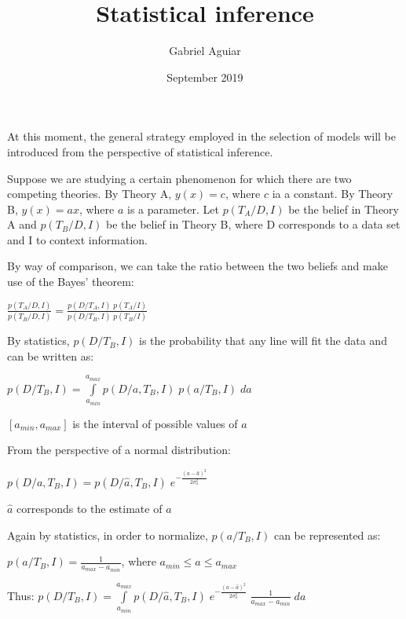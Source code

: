 \documentclass{article}
\title{Statistical inference}
\author{Gabriel Aguiar}
\date{September 2019}
\begin{document}
\maketitle

At this moment, the general strategy employed in the selection of models will be introduced from the perspective of statistical inference.

Suppose we are studying a certain phenomenon for which there are two competing theories. By Theory A, $y(x) = c$, where $c$ ia a constant. By Theory B, $y(x) = ax$, where $a$ is a parameter. Let $p(T_{A}/D,I)$ be the belief in Theory A and $p(T_{B}/D,I)$ be the belief in Theory B, where D corresponds to a data set and I to context information.

By way of comparison, we can take the ratio between the two beliefs and make use of the Bayes' theorem:

\hfill

$\frac{p(T_{A}/D,I)}{p(T_{B}/D,I)} = \frac{p(D/T_{A},I) \; p(T_{A}/I)}{p(D/T_{B},I) \; p(T_{B}/I)}$

\hfill

By statistics, $p(D/T_{B},I)$ is the probability that any line will fit the data and can be written as:

\hfill

$p(D/T_{B},I) = \int\limits_{a_{min}}^{a_{max}} p(D/a,T_{B},I) \; p(a/T_{B},I) \; da$

\hfill

$[a_{min},a_{max}]$ is the interval of possible values of $a$

\hfill

From the perspective of a normal distribution:

\hfill

$p(D/a,T_{B},I) = p(D/\hat{a},T_{B},I) \; e^{-\frac{(a - \hat{a})^{2}}{2 \sigma_{a}^{2}}}$

\hfill

$\hat{a}$ corresponds to the estimate of $a$

\hfill

Again by statistics, in order to normalize, $p(a/T_{B},I)$ can be represented as:

\hfill

$p(a/T_{B},I) = \frac{1}{a_{max} - a_{min}}$, where $a_{min} \leq a \leq a_{max}$

\hfill

Thus: $p(D/T_{B},I) = \int\limits_{a_{min}}^{a_{max}} p(D/\hat{a},T_{B},I) \; e^{-\frac{(a - \hat{a})^{2}}{2 \sigma_{a}^{2}}} \; \frac{1}{a_{max} - a_{min}} \; da$
\end{document}

